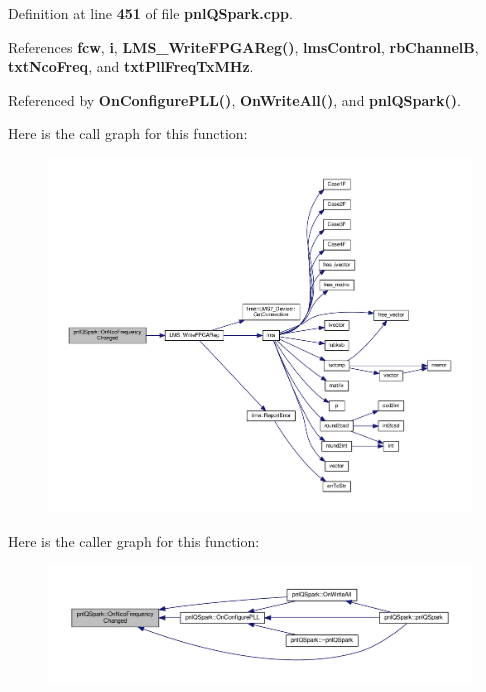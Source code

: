 Definition at line {\bf 451} of file {\bf pnl\+Q\+Spark.\+cpp}.



References {\bf fcw}, {\bf i}, {\bf L\+M\+S\+\_\+\+Write\+F\+P\+G\+A\+Reg()}, {\bf lms\+Control}, {\bf rb\+ChannelB}, {\bf txt\+Nco\+Freq}, and {\bf txt\+Pll\+Freq\+Tx\+M\+Hz}.



Referenced by {\bf On\+Configure\+P\+L\+L()}, {\bf On\+Write\+All()}, and {\bf pnl\+Q\+Spark()}.



Here is the call graph for this function\+:
\nopagebreak
\begin{figure}[H]
\begin{center}
\leavevmode
\includegraphics[width=350pt]{d5/d92/classpnlQSpark_ae7cb54dd959f523c60d3a9f12bdb7faf_cgraph}
\end{center}
\end{figure}




Here is the caller graph for this function\+:
\nopagebreak
\begin{figure}[H]
\begin{center}
\leavevmode
\includegraphics[width=350pt]{d5/d92/classpnlQSpark_ae7cb54dd959f523c60d3a9f12bdb7faf_icgraph}
\end{center}
\end{figure}


